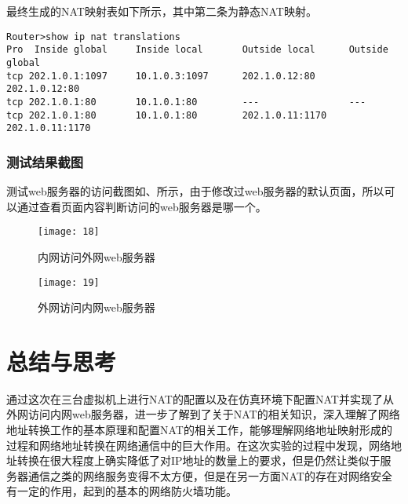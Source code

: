 \documentclass[lang=cn,11pt]{elegantpaper}
\begin{document}
最终生成的NAT映射表如下所示，其中第二条为静态NAT映射。
\begin{lstlisting}
Router>show ip nat translations
Pro  Inside global     Inside local       Outside local      Outside global
tcp 202.1.0.1:1097     10.1.0.3:1097      202.1.0.12:80      202.1.0.12:80
tcp 202.1.0.1:80       10.1.0.1:80        ---                ---
tcp 202.1.0.1:80       10.1.0.1:80        202.1.0.11:1170    202.1.0.11:1170
\end{lstlisting}

\subsubsection{测试结果截图}
测试web服务器的访问截图如、所示，由于修改过web服务器的默认页面，所以可以通过查看页面内容判断访问的web服务器是哪一个。
\begin{figure}[htbp]
		\centering
		\texttt{[image: 18]}
	\caption{内网访问外网web服务器\label{fig:14}}
\end{figure}

\begin{figure}[htbp]
	\centering
	\texttt{[image: 19]}
	\caption{外网访问内网web服务器 \label{fig:15}}
\end{figure}
\newpage
\section{总结与思考}
通过这次在三台虚拟机上进行NAT的配置以及在仿真环境下配置NAT并实现了从外网访问内网web服务器，进一步了解到了关于NAT的相关知识，深入理解了网络地址转换工作的基本原理和配置NAT的相关工作，能够理解网络地址映射形成的过程和网络地址转换在网络通信中的巨大作用。在这次实验的过程中发现，网络地址转换在很大程度上确实降低了对IP地址的数量上的要求，但是仍然让类似于服务器通信之类的网络服务变得不太方便，但是在另一方面NAT的存在对网络安全有一定的作用，起到的基本的网络防火墙功能。


%
%
\end{document}

